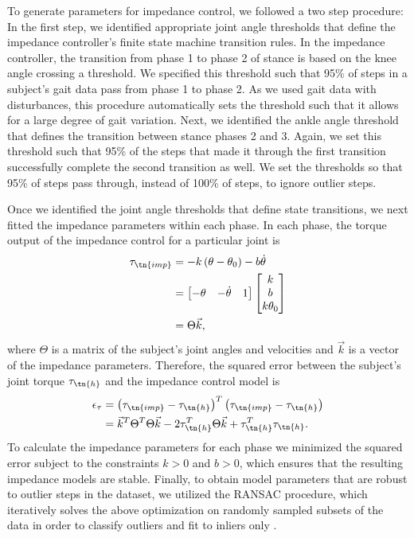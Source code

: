 To generate parameters for impedance control, we followed a two step procedure:
In the first step, we identified appropriate joint angle thresholds that define
the impedance controller's finite state machine transition rules. In the
impedance controller, the transition from phase 1 to phase 2 of stance is based
on the knee angle crossing a threshold. We specified this threshold such that
95\% of steps in a subject's gait data pass from phase 1 to phase 2. As we used
gait data with disturbances, this procedure automatically sets the threshold
such that it allows for a large degree of gait variation. Next, we identified
the ankle angle threshold that defines the transition between stance phases 2
and 3.  Again, we set this threshold such that 95\% of the steps that made it
through the first transition successfully complete the second transition as
well. We set the thresholds so that 95\% of steps pass through, instead of 100\%
of steps, to ignore outlier steps.

Once we identified the joint angle thresholds that define state transitions, we
next fitted the impedance parameters within each phase. In each phase, the torque
output of the impedance control for a particular joint is 
\begin{align}
    \tau_\tn{imp} &= -k \left( \theta - \theta_0 \right) - b \dot{\theta} \\
        &= \begin{bmatrix} -\theta & -\dot{\theta} & 1 \end{bmatrix}
            \begin{bmatrix} k \\ b \\ k \theta_0 \end{bmatrix} \\
        &= \Theta \vec{k},
\end{align}
where $\Theta$ is a matrix of the subject's joint angles and velocities and
$\vec{k}$ is a vector of the impedance parameters. Therefore, the squared error
between the subject's joint torque $\tau_\tn{h}$ and the impedance control model
is
\begin{align}
    \epsilon_\tau & = {\left( \tau_\tn{imp} - \tau_\tn{h} \right)}^T 
        \left( \tau_\tn{imp} - \tau_\tn{h} \right) \\
        &= \vec{k}^T \Theta^T \Theta \vec{k} - 2\tau_\tn{h}^T \Theta \vec{k} 
        + \tau_\tn{h}^T \tau_\tn{h}.
\end{align}
To calculate the impedance parameters for each phase we minimized the squared
error subject to the constraints $k>0$ and ${b > 0}$, which ensures that the
resulting impedance models are stable. Finally, to obtain model parameters that
are robust to outlier steps in the dataset, we utilized the RANSAC procedure,
which iteratively solves the above optimization on randomly sampled subsets of
the data in order to classify outliers and fit to inliers only
\citep{fischler1981random}.

